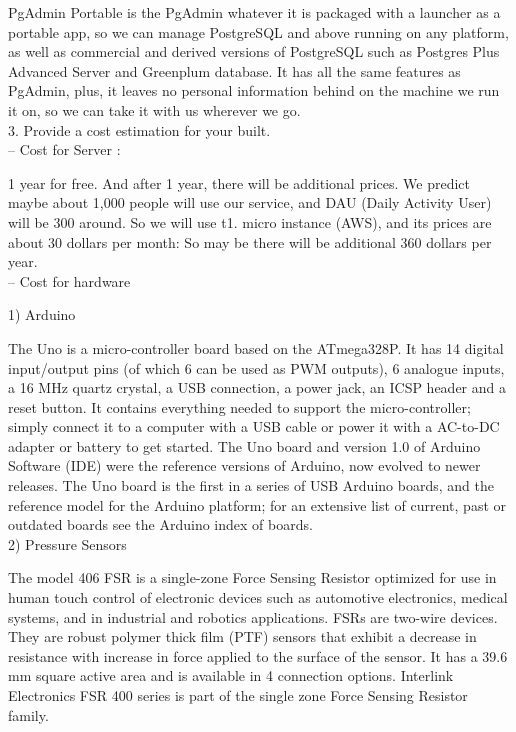 \documentclass[conference]{IEEEtran}
\begin{document}
PgAdmin Portable is the PgAdmin whatever it is packaged with a launcher as a portable app, so we can manage PostgreSQL and above running on any platform, as well as commercial and derived versions of PostgreSQL such as Postgres Plus Advanced Server and Greenplum database. It has all the same features as PgAdmin, plus, it leaves no personal information behind on the machine we run it on, so we can take it with us wherever we go.\\

3.	Provide a cost estimation for your built.\\

-- Cost for Server :

1 year for free. And after 1 year, there will be additional prices. We predict maybe about 1,000 people will use our service, and DAU (Daily Activity User) will be 300 around. So we will use t1. micro instance (AWS), and its prices are about 30 dollars per month: So may be there will be additional 360 dollars per year.\\

-- Cost for hardware

1)	Arduino

The Uno is a micro-controller board based on the ATmega328P. It has 14 digital input/output pins (of which 6 can be used as PWM outputs), 6 analogue inputs, a 16 MHz quartz crystal, a USB connection, a power jack, an ICSP header and a reset button. It contains everything needed to support the micro-controller; simply connect it to a computer with a USB cable or power it with a AC-to-DC adapter or battery to get started. The Uno board and version 1.0 of Arduino Software (IDE) were the reference versions of Arduino, now evolved to newer releases. The Uno board is the first in a series of USB Arduino boards, and the reference model for the Arduino platform; for an extensive list of current, past or outdated boards see the Arduino index of boards.\\

2)	Pressure Sensors

The model 406 FSR is a single-zone Force Sensing Resistor optimized for use in human touch control of electronic devices such as automotive electronics, medical systems, and in industrial and robotics applications. FSRs are two-wire devices. They are robust polymer thick film (PTF) sensors that exhibit a decrease in resistance with increase in force applied to the surface of the sensor. It has a 39.6 mm square active area and is available in 4 connection options. Interlink Electronics FSR 400 series is part of the single zone Force Sensing Resistor family.\\
\end{document}
